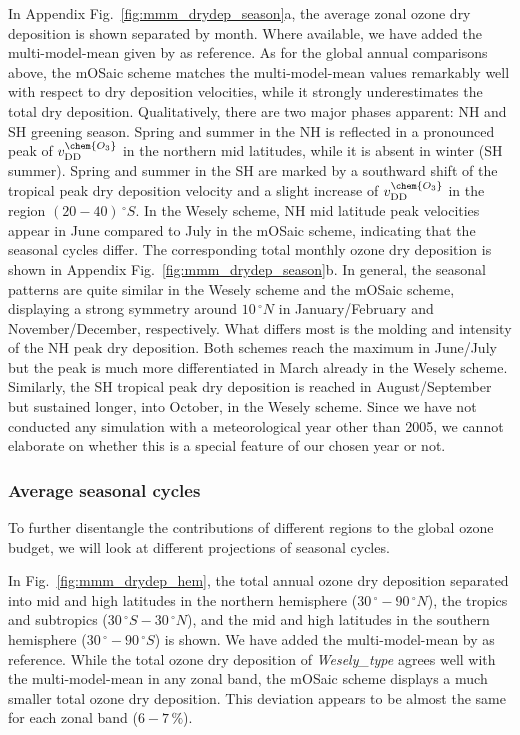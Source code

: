 \documentclass[gmd, manuscript]{copernicus}
\begin{document}
In Appendix Fig.~\ref{fig:mmm_drydep_season}a, the average zonal ozone dry deposition is shown separated by month. Where available, we have added the multi-model-mean given by \citet{ACP:Hardacre2015} as reference. As for the global annual comparisons above, the mOSaic scheme matches the multi-model-mean values remarkably well with respect to dry deposition velocities, while it strongly underestimates the total dry deposition. Qualitatively, there are two major phases apparent: NH and SH greening season. Spring and summer in the NH is reflected in a pronounced peak of $v_\text{DD}^\chem{O_3}$ in the northern mid latitudes, while it is absent in winter (SH summer). Spring and summer in the SH are marked by a southward shift of the tropical peak dry deposition velocity and a slight increase of $v_\text{DD}^\chem{O_3}$ in the region $(20-40)\,\unit{^\circ S}$. In the Wesely scheme, NH mid latitude peak velocities appear in June compared to July in the mOSaic scheme, indicating that the seasonal cycles differ. The corresponding total monthly ozone dry deposition is shown in Appendix Fig.~\ref{fig:mmm_drydep_season}b. In general, the seasonal patterns are quite similar in the Wesely scheme and the mOSaic scheme, displaying a strong symmetry around $10\,\unit{^\circ N}$ in January/February and November/December, respectively. What differs most is the molding and intensity of the NH peak dry deposition. Both schemes reach the maximum in June/July but the peak is much more differentiated in March already in the Wesely scheme. Similarly, the SH tropical peak dry deposition is reached in August/September but sustained longer, into October, in the Wesely scheme. Since we have not conducted any simulation with a meteorological year other than 2005, we cannot elaborate on whether this is a special feature of our chosen year or not.
%
\subsubsection{Average seasonal cycles}
\label{subsubsec:seasons}
%
To further disentangle the contributions of different regions to the global ozone budget, we will look at different projections of seasonal cycles.

In Fig.~\ref{fig:mmm_drydep_hem}, the total annual ozone dry deposition separated into mid and high latitudes in the northern hemisphere ($30\,\unit{^\circ}-90\,\unit{^\circ N}$), the tropics and subtropics ($30\,\unit{^\circ S}-30\,\unit{^\circ N}$), and the mid and high latitudes in the southern hemisphere ($30\,\unit{^\circ}-90\,\unit{^\circ S}$) is shown. We have added the multi-model-mean by \citet{ACP:Hardacre2015} as reference. While the total ozone dry deposition of \emph{Wesely\_type} agrees well with the multi-model-mean in any zonal band, the mOSaic scheme displays a much smaller total ozone dry deposition. This deviation appears to be almost the same for each zonal band ($6-7\,\unit{\%}$).
\end{document}
